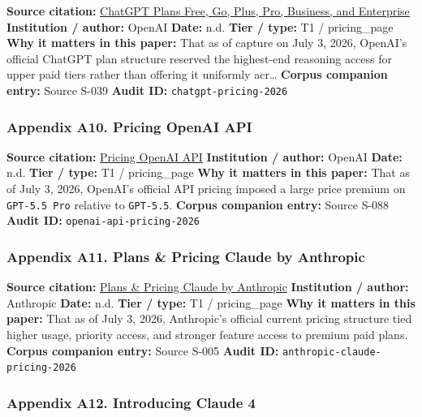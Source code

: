 \documentclass[
  american,
  11pt,
  letterpaper,
]{article}
\begin{document}
\textbf{Source citation:} \href{https://chatgpt.com/pricing/}{ChatGPT
Plans \textbar{} Free, Go, Plus, Pro, Business, and Enterprise}
\textbf{Institution / author:} OpenAI \textbf{Date:} n.d. \textbf{Tier /
type:} T1 / pricing\_page \textbf{Why it matters in this paper:} That as
of capture on July 3, 2026, OpenAI's official ChatGPT plan structure
reserved the highest-end reasoning access for upper paid tiers rather
than offering it uniformly acr\ldots{} \textbf{Corpus companion entry:}
Source S-039 \textbf{Audit ID:} \texttt{chatgpt-pricing-2026}

\subsubsection{Appendix A10. Pricing \textbar{} OpenAI
API}\label{appendix-a10-pricing-openai-api}

\textbf{Source citation:}
\href{https://developers.openai.com/api/docs/pricing}{Pricing \textbar{}
OpenAI API} \textbf{Institution / author:} OpenAI \textbf{Date:} n.d.
\textbf{Tier / type:} T1 / pricing\_page \textbf{Why it matters in this
paper:} That as of July 3, 2026, OpenAI's official API pricing imposed a
large price premium on \texttt{GPT-5.5\ Pro} relative to
\texttt{GPT-5.5}. \textbf{Corpus companion entry:} Source S-088
\textbf{Audit ID:} \texttt{openai-api-pricing-2026}

\subsubsection{Appendix A11. Plans \& Pricing \textbar{} Claude by
Anthropic}\label{appendix-a11-plans-pricing-claude-by-anthropic}

\textbf{Source citation:} \href{https://claude.com/pricing}{Plans \&
Pricing \textbar{} Claude by Anthropic} \textbf{Institution / author:}
Anthropic \textbf{Date:} n.d. \textbf{Tier / type:} T1 / pricing\_page
\textbf{Why it matters in this paper:} That as of July 3, 2026,
Anthropic's official current pricing structure tied higher usage,
priority access, and stronger feature access to premium paid plans.
\textbf{Corpus companion entry:} Source S-005 \textbf{Audit ID:}
\texttt{anthropic-claude-pricing-2026}

\subsubsection{Appendix A12. Introducing Claude
4}\label{appendix-a12-introducing-claude-4}
\end{document}
